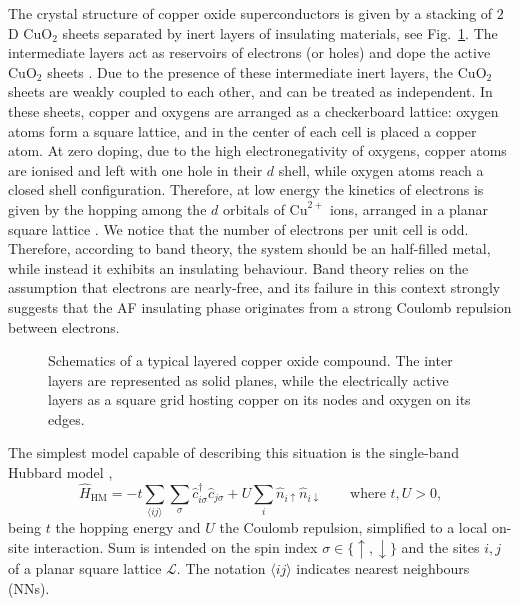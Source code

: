 The crystal structure of copper oxide superconductors is given by a stacking of $2$D $\mathrm{Cu} \mathrm{O}_2$ sheets separated by inert layers of insulating materials, see Fig.~\ref{fig:copper-oxides}. The intermediate layers act as reservoirs of electrons (or holes) and dope the active $\mathrm{Cu} \mathrm{O}_2$ sheets \cite{grosso2014solid}. Due to the presence of these intermediate inert layers, the $\mathrm{Cu} \mathrm{O}_2$ sheets are weakly coupled to each other, and can be treated as independent. In these sheets, copper and oxygens are arranged as a checkerboard lattice: oxygen atoms form a square lattice, and in the center of each cell is placed a copper atom. At zero doping, due to the high electronegativity of oxygens, copper atoms are ionised and left with one hole in their $d$ shell, while oxygen atoms reach a closed shell configuration. Therefore, at low energy the kinetics of electrons is given by the hopping among the $d$ orbitals of $\mathrm{Cu}^{2+}$ ions, arranged in a planar square lattice \cite{lee2006doping}. We notice that the number of electrons per unit cell is odd. Therefore, according to band theory, the system should be an half-filled metal, while instead it exhibits an insulating behaviour. Band theory relies on the assumption that electrons are nearly-free, and its failure in this context strongly suggests that the AF insulating phase originates from a strong Coulomb repulsion between electrons.

\begin{figure}
	\centering
	
	\caption{Schematics of a typical layered copper oxide compound. The inter layers are represented as solid planes, while the electrically active layers as a square grid hosting copper on its nodes and oxygen on its edges.}
	\label{fig:copper-oxides}
\end{figure}

The simplest model capable of describing this situation is the single-band Hubbard model \cite{hubbard1963electron},
\begin{equation}\label{eq:hubbard-model}
	\hat H_\mathrm{HM} = 
	-t \sum_{\langle ij \rangle} \sum_\sigma \hat c_{i\sigma}^\dagger \hat c_{j\sigma}
	+ U \sum_i \hat n_{i\uparrow} \hat n_{i\downarrow}
	\qquad
	\text{where $t, U  > 0$,}
\end{equation}
being $t$ the hopping energy and $U$ the Coulomb repulsion, simplified to a local on-site interaction. Sum is intended on the spin index $\sigma \in \lbrace \uparrow, \downarrow \rbrace$ and the sites $i,j$ of a planar square lattice $\mathcal{L}$. The notation $\langle ij \rangle$ indicates nearest neighbours (NNs). 

